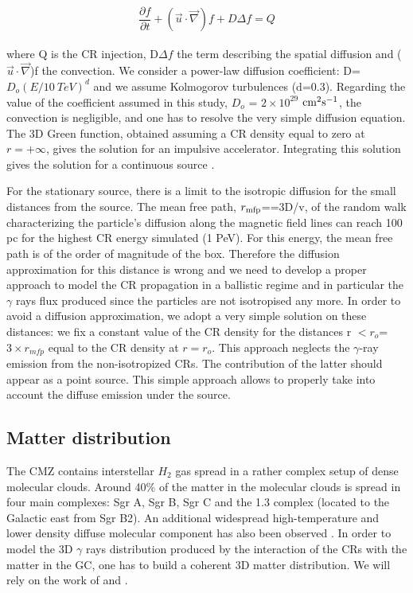 \documentclass[a4paper,fleqn,usenatbib]{mnras}
\begin{document}
\begin{center}
\begin{eqnarray}
\dfrac{\partial f}{\partial t} +(\vec{u} \cdot \vec{\nabla})f +  D\Delta{f} = Q
\label{transport1}
\end{eqnarray}
\end{center} 
where Q is the CR injection, D$\Delta{f}$ the term describing the spatial diffusion and ($\vec{u} \cdot \vec{\nabla}$)f the convection. We consider a power-law diffusion coefficient: D=$D_o {\left(E/10 \ TeV\right)}^{d}$ and we assume Kolmogorov turbulences (d=0.3). Regarding the value of the coefficient assumed in this study, $D_o$ = $2\times 10^{29}$ $\rm cm^2s^{-1}$, the convection is negligible, and one has to resolve the very simple diffusion equation. The 3D Green function, obtained assuming a CR density equal to zero at $r=+\infty$, gives the solution for an impulsive accelerator. Integrating this solution gives the solution for a continuous source \citep{1990acr..book.....B}. 

For the stationary source, there is a limit to the isotropic diffusion for the small distances from the source. The mean free path, $r\rm_{mfp}$==3D/v, of the random walk characterizing the particle's diffusion along the magnetic field lines can reach 100 pc for the highest CR energy simulated (1 PeV). For this energy, the mean free path is of the order of magnitude of the box. Therefore the diffusion approximation for this distance is wrong and we need to develop a proper approach to model the CR propagation in a ballistic regime and in particular the $\gamma$ rays flux produced since the particles are not isotropised any more. In order to avoid a diffusion approximation, we adopt a very simple solution on these distances: we fix a constant value of the CR density for the distances r $ < r_o$=$3 \times r_{mfp}$ equal to the CR density at $r=r_o$. This approach neglects the $\gamma$-ray emission from the non-isotropized CRs. The contribution of the latter should appear as a point source. This simple approach allows to properly take into account the diffuse emission under the source.




\subsection{Matter distribution}
\label{Matter}
The CMZ contains interstellar $H_2$ gas spread in a rather complex setup of dense molecular clouds. Around 40\% of the matter in the molecular clouds is spread in four main complexes: Sgr A, Sgr B, Sgr C and the 1.3 complex (located to the Galactic east from Sgr B2). An additional widespread high-temperature and lower density diffuse molecular component has also been observed \citep{1998A&A...331..959D}. In order to model the 3D $\gamma$ rays distribution produced by the interaction of the CRs with the matter in the GC, one has to build a coherent 3D matter distribution. We will rely on the work of \citet{2004MNRAS.349.1167S} and \citet{2007A&A...467..611F}.
\end{document}
